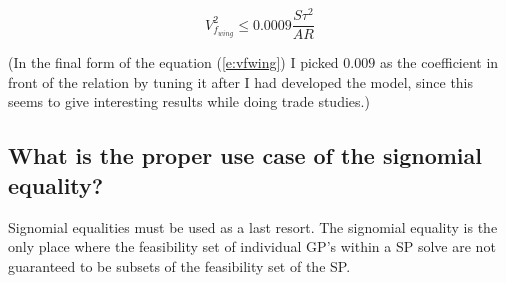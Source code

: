 \begin{equation}
    V_{f_{wing}}^2 \leq 0.0009 \frac{S \tau^2}{AR}
	\label{e:vfwing}
\end{equation}

(In the final form of the equation (\ref{e:vfwing}) I picked $0.009$ as the coefficient in front of the relation by tuning it after I had developed
the model, since this seems to give interesting results while doing trade studies.)

\subsection{What is the proper use case of the signomial equality?} 

Signomial equalities must be used as a last resort. The signomial equality is the only place 
where the feasibility set of individual \gls{GP}'s within a \gls{SP} solve are not guaranteed 
to be subsets of the feasibility set of the \gls{SP}. 
